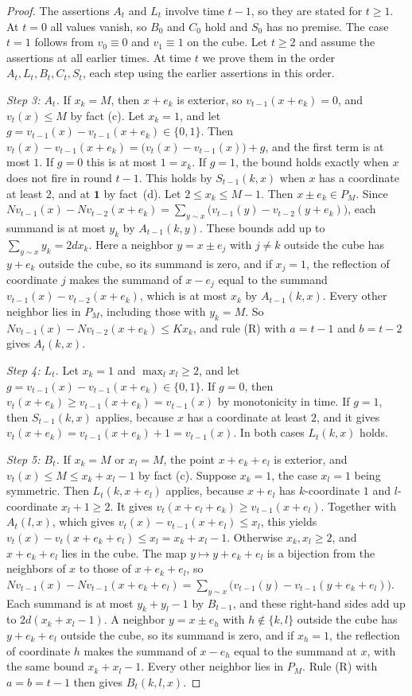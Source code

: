 \documentclass[12pt]{amsart}
\begin{document}
\begin{proof}
The assertions $A_t$ and $L_t$ involve time $t-1$, so they are stated for $t\geq1$. At $t=0$ all values vanish, so $B_0$ and $C_0$ hold and $S_0$ has no premise. The case $t=1$ follows from $v_0\equiv0$ and $v_1\equiv1$ on the cube. Let $t\geq2$ and assume the assertions at all earlier times. At time $t$ we prove them in the order $A_t,L_t,B_t,C_t,S_t$, each step using the earlier assertions in this order.

\emph{Step 3: $A_t$.} If $x_k=M$, then $x+e_k$ is exterior, so $v_{t-1}(x+e_k)=0$, and $v_t(x)\leq M$ by fact (c). Let $x_k=1$, and let $g=v_{t-1}(x)-v_{t-1}(x+e_k)\in\{0,1\}$. Then $v_t(x)-v_{t-1}(x+e_k)=\big(v_t(x)-v_{t-1}(x)\big)+g$, and the first term is at most $1$. If $g=0$ this is at most $1=x_k$. If $g=1$, the bound holds exactly when $x$ does not fire in round $t-1$. This holds by $S_{t-1}(k,x)$ when $x$ has a coordinate at least $2$, and at $\mathbf{1}$ by fact~(d). Let $2\leq x_k\leq M-1$. Then $x\pm e_k\in P_M$. Since $Nv_{t-1}(x)-Nv_{t-2}(x+e_k)=\sum_{y\sim x}\big(v_{t-1}(y)-v_{t-2}(y+e_k)\big)$, each summand is at most $y_k$ by $A_{t-1}(k,y)$. These bounds add up to $\sum_{y\sim x}y_k=2dx_k$. Here a neighbor $y=x\pm e_j$ with $j\neq k$ outside the cube has $y+e_k$ outside the cube, so its summand is zero, and if $x_j=1$, the reflection of coordinate $j$ makes the summand of $x-e_j$ equal to the summand $v_{t-1}(x)-v_{t-2}(x+e_k)$, which is at most $x_k$ by $A_{t-1}(k,x)$. Every other neighbor lies in $P_M$, including those with $y_k=M$. So $Nv_{t-1}(x)-Nv_{t-2}(x+e_k)\leq Kx_k$, and rule (R) with $a=t-1$ and $b=t-2$ gives $A_t(k,x)$.

\emph{Step 4: $L_t$.} Let $x_k=1$ and $\max_l x_l\geq2$, and let $g=v_{t-1}(x)-v_{t-1}(x+e_k)\in\{0,1\}$. If $g=0$, then $v_t(x+e_k)\geq v_{t-1}(x+e_k)=v_{t-1}(x)$ by monotonicity in time. If $g=1$, then $S_{t-1}(k,x)$ applies, because $x$ has a coordinate at least $2$, and it gives $v_t(x+e_k)=v_{t-1}(x+e_k)+1=v_{t-1}(x)$. In both cases $L_t(k,x)$ holds.

\emph{Step 5: $B_t$.} If $x_k=M$ or $x_l=M$, the point $x+e_k+e_l$ is exterior, and $v_t(x)\leq M\leq x_k+x_l-1$ by fact (c). Suppose $x_k=1$, the case $x_l=1$ being symmetric. Then $L_t(k,x+e_l)$ applies, because $x+e_l$ has $k$-coordinate $1$ and $l$-coordinate $x_l+1\geq2$. It gives $v_t(x+e_l+e_k)\geq v_{t-1}(x+e_l)$. Together with $A_t(l,x)$, which gives $v_t(x)-v_{t-1}(x+e_l)\leq x_l$, this yields $v_t(x)-v_t(x+e_k+e_l)\leq x_l=x_k+x_l-1$. Otherwise $x_k,x_l\geq2$, and $x+e_k+e_l$ lies in the cube. The map $y\mapsto y+e_k+e_l$ is a bijection from the neighbors of $x$ to those of $x+e_k+e_l$, so $Nv_{t-1}(x)-Nv_{t-1}(x+e_k+e_l)=\sum_{y\sim x}\big(v_{t-1}(y)-v_{t-1}(y+e_k+e_l)\big)$. Each summand is at most $y_k+y_l-1$ by $B_{t-1}$, and these right-hand sides add up to $2d(x_k+x_l-1)$. A neighbor $y=x\pm e_h$ with $h\notin\{k,l\}$ outside the cube has $y+e_k+e_l$ outside the cube, so its summand is zero, and if $x_h=1$, the reflection of coordinate $h$ makes the summand of $x-e_h$ equal to the summand at $x$, with the same bound $x_k+x_l-1$. Every other neighbor lies in $P_M$. Rule (R) with $a=b=t-1$ then gives $B_t(k,l,x)$.


\end{proof}
\end{document}
